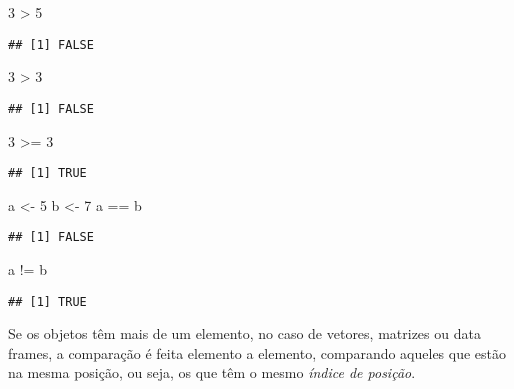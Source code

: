 \documentclass[
]{book}
\newenvironment{Shaded}{\begin{snugshade}}{\end{snugshade}}
\newcommand{\DecValTok}[1]{\textcolor[rgb]{0.00,0.00,0.81}{#1}}
\newcommand{\NormalTok}[1]{#1}
\newcommand{\OtherTok}[1]{\textcolor[rgb]{0.56,0.35,0.01}{#1}}
\newcommand{\SpecialCharTok}[1]{\textcolor[rgb]{0.00,0.00,0.00}{#1}}
\begin{document}
\begin{Shaded}
\begin{Highlighting}[]
\DecValTok{3} \SpecialCharTok{\textgreater{}} \DecValTok{5}
\end{Highlighting}
\end{Shaded}

\begin{verbatim}
## [1] FALSE
\end{verbatim}

\begin{Shaded}
\begin{Highlighting}[]
\DecValTok{3} \SpecialCharTok{\textgreater{}} \DecValTok{3}
\end{Highlighting}
\end{Shaded}

\begin{verbatim}
## [1] FALSE
\end{verbatim}

\begin{Shaded}
\begin{Highlighting}[]
\DecValTok{3} \SpecialCharTok{\textgreater{}=} \DecValTok{3}
\end{Highlighting}
\end{Shaded}

\begin{verbatim}
## [1] TRUE
\end{verbatim}

\begin{Shaded}
\begin{Highlighting}[]
\NormalTok{a }\OtherTok{\textless{}{-}} \DecValTok{5}
\NormalTok{b }\OtherTok{\textless{}{-}} \DecValTok{7}
\NormalTok{a }\SpecialCharTok{==}\NormalTok{ b}
\end{Highlighting}
\end{Shaded}

\begin{verbatim}
## [1] FALSE
\end{verbatim}

\begin{Shaded}
\begin{Highlighting}[]
\NormalTok{a }\SpecialCharTok{!=}\NormalTok{ b}
\end{Highlighting}
\end{Shaded}

\begin{verbatim}
## [1] TRUE
\end{verbatim}

Se os objetos têm mais de um elemento, no caso de vetores, matrizes ou data frames, a comparação é feita elemento a elemento, comparando aqueles que estão na mesma posição, ou seja, os que têm o mesmo \emph{índice de posição}.
\end{document}

